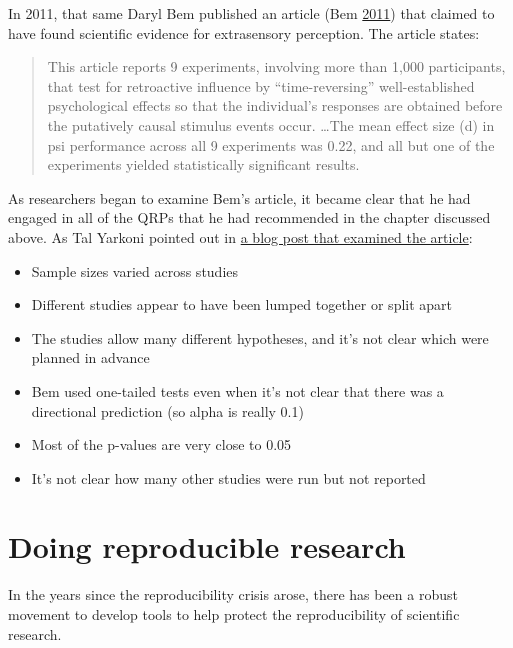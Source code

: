 \documentclass[12pt,]{book}
\providecommand{\tightlist}{%
  \setlength{\itemsep}{0pt}\setlength{\parskip}{0pt}}
\theoremstyle{definition}
\theoremstyle{definition}
\theoremstyle{definition}
\theoremstyle{remark}
\begin{document}
In 2011, that same Daryl Bem published an article (Bem \protect\hyperlink{ref-bem:2011}{2011}) that claimed to have found scientific evidence for extrasensory perception. The article states:

\begin{quote}
This article reports 9 experiments, involving more than 1,000 participants, that test for retroactive influence by ``time-reversing'' well-established psychological effects so that the individual's responses are obtained before the putatively causal stimulus events occur. \ldots{}The mean effect size (d) in psi performance across all 9 experiments was 0.22, and all but one of the experiments yielded statistically significant results.
\end{quote}

As researchers began to examine Bem's article, it became clear that he had engaged in all of the QRPs that he had recommended in the chapter discussed above. As Tal Yarkoni pointed out in \href{http://www.talyarkoni.org/blog/2011/01/10/the-psychology-of-parapsychology-or-why-good-researchers-publishing-good-articles-in-good-journals-can-still-get-it-totally-wrong/}{a blog post that examined the article}:

\begin{itemize}
\tightlist
\item
  Sample sizes varied across studies
\item
  Different studies appear to have been lumped together or split apart
\item
  The studies allow many different hypotheses, and it's not clear which were planned in advance
\item
  Bem used one-tailed tests even when it's not clear that there was a directional prediction (so alpha is really 0.1)
\item
  Most of the p-values are very close to 0.05
\item
  It's not clear how many other studies were run but not reported
\end{itemize}

\hypertarget{doing-reproducible-research-1}{%
\section{Doing reproducible research}\label{doing-reproducible-research-1}}

In the years since the reproducibility crisis arose, there has been a robust movement to develop tools to help protect the reproducibility of scientific research.
\end{document}
